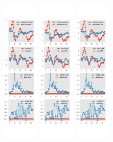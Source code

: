 \documentclass[]{article}
\begin{document}
\begin{figure}[ht]
\begin{subfigure}[b]{\textwidth}
		\includegraphics[width=0.19\textwidth]{figures/spf_ni_est_joint_diag0.png}
		\includegraphics[width=0.19\textwidth]{figures/spf_ni_est_joint_diag1.png}
		\includegraphics[width=0.19\textwidth]{figures/spf_ni_est_joint_diag2.png}

\end{subfigure}
\end{figure}
\end{document}

